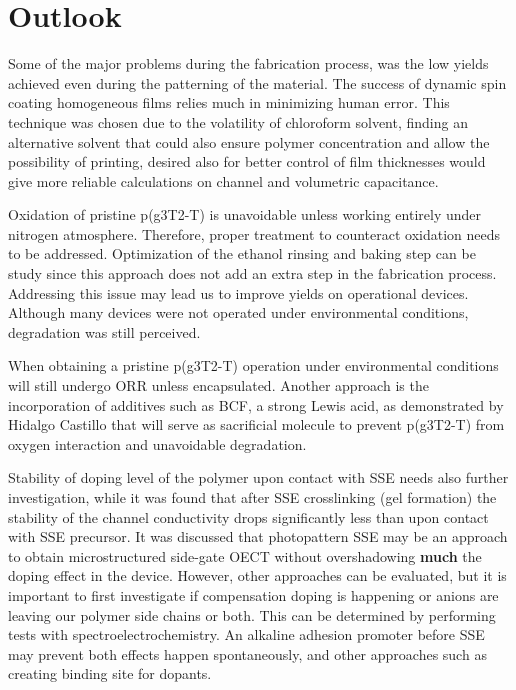 \section{Outlook}

Some of the major problems during the fabrication process, was the low yields achieved even during the patterning of the material. The success of dynamic spin coating homogeneous films relies much in minimizing human error. This technique was chosen due to the volatility of chloroform solvent, finding an alternative solvent that could also ensure polymer concentration and allow the possibility of printing, desired also for better control of film thicknesses would give more reliable calculations on channel and volumetric capacitance.

Oxidation of pristine p(g3T2-T) is unavoidable unless working entirely under nitrogen atmosphere. Therefore, proper treatment to counteract oxidation needs to be addressed. Optimization of the ethanol rinsing and baking step can be study since this approach does not add an extra step in the fabrication process. Addressing this issue may lead us to improve yields on operational devices. Although many devices were not operated under environmental conditions, degradation was still perceived.

When obtaining a pristine p(g3T2-T) operation under environmental conditions will still undergo ORR unless encapsulated. Another approach is the incorporation of additives such as BCF, a strong Lewis acid, as demonstrated by Hidalgo Castillo \cite{hidalgocastilloSimultaneousPerformanceStability2022a} that will serve as sacrificial molecule to prevent p(g3T2-T) from oxygen interaction and unavoidable degradation. 

Stability of doping level of the polymer upon contact with SSE needs also further investigation, while it was found that after SSE crosslinking (gel formation) the stability of the channel conductivity drops significantly less than upon contact with SSE precursor. It was discussed that photopattern SSE may be an approach to obtain microstructured side-gate OECT without overshadowing \textbf{much} the doping effect in the device. However, other approaches can be evaluated, but it is important to first investigate if compensation doping is happening or anions are leaving our polymer side chains or both. This can be determined by performing tests with spectroelectrochemistry. An alkaline adhesion promoter before SSE may prevent both effects happen spontaneously, and other approaches such as creating binding site for dopants. 





